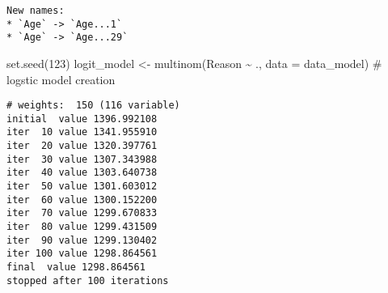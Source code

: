 \documentclass[
  letterpaper,
  DIV=11,
  numbers=noendperiod]{scrartcl}
\newenvironment{Shaded}{\begin{snugshade}}{\end{snugshade}}
\newcommand{\AttributeTok}[1]{\textcolor[rgb]{0.40,0.45,0.13}{#1}}
\newcommand{\CommentTok}[1]{\textcolor[rgb]{0.37,0.37,0.37}{#1}}
\newcommand{\DecValTok}[1]{\textcolor[rgb]{0.68,0.00,0.00}{#1}}
\newcommand{\FunctionTok}[1]{\textcolor[rgb]{0.28,0.35,0.67}{#1}}
\newcommand{\NormalTok}[1]{\textcolor[rgb]{0.00,0.23,0.31}{#1}}
\newcommand{\OtherTok}[1]{\textcolor[rgb]{0.00,0.23,0.31}{#1}}
\newcommand{\SpecialCharTok}[1]{\textcolor[rgb]{0.37,0.37,0.37}{#1}}
\begin{document}
\begin{Shaded}
\end{Shaded}

\begin{verbatim}
New names:
* `Age` -> `Age...1`
* `Age` -> `Age...29`
\end{verbatim}

\begin{Shaded}
\begin{Highlighting}[]
\FunctionTok{set.seed}\NormalTok{(}\DecValTok{123}\NormalTok{)}
\NormalTok{logit\_model }\OtherTok{\textless{}{-}} \FunctionTok{multinom}\NormalTok{(Reason }\SpecialCharTok{\textasciitilde{}}\NormalTok{ ., }\AttributeTok{data =}\NormalTok{ data\_model) }\CommentTok{\# logstic model creation}
\end{Highlighting}
\end{Shaded}

\begin{verbatim}
# weights:  150 (116 variable)
initial  value 1396.992108 
iter  10 value 1341.955910
iter  20 value 1320.397761
iter  30 value 1307.343988
iter  40 value 1303.640738
iter  50 value 1301.603012
iter  60 value 1300.152200
iter  70 value 1299.670833
iter  80 value 1299.431509
iter  90 value 1299.130402
iter 100 value 1298.864561
final  value 1298.864561 
stopped after 100 iterations
\end{verbatim}
\end{document}
